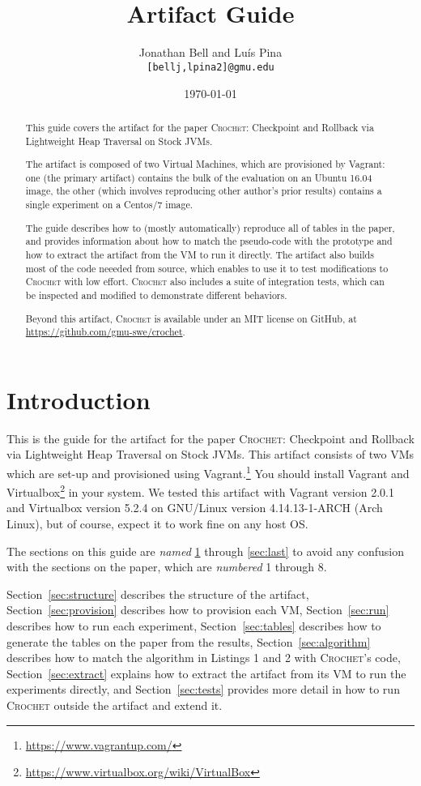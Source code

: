 \documentclass[12pt]{article}
\title{\emph{\papertitle} \\ Artifact Guide}
\author{Jonathan Bell and Lu\'{i}s Pina \\ \texttt{[bellj,lpina2]@gmu.edu}}
\affil{George Mason University}
\date{\today}
\newcommand{\sysname}{\textsc{Crochet}\xspace}
\newcommand{\papertitle}{\sysname: Checkpoint and Rollback via Lightweight Heap Traversal on Stock JVMs\xspace}
\begin{document}
\maketitle

\begin{abstract}

    This guide covers the artifact for the paper \papertitle.

    The artifact is composed of two Virtual Machines, which are provisioned by
    Vagrant: one (the primary artifact) contains the bulk of the evaluation on an Ubuntu 16.04 image,
    the other (which involves reproducing other author's prior results) contains a single experiment on a Centos/7 image.

    The guide describes how to (mostly automatically) reproduce all of tables in the paper,
    and provides information about how to match the pseudo-code with the
    prototype and how to extract the artifact from the VM to run it directly.
    The artifact also builds most of the code neeeded from source, which enables
    to use it to test modifications to \sysname with low effort. \sysname also includes a suite of integration tests, which can be inspected and modified to demonstrate different behaviors.

Beyond this artifact, \sysname is available under an MIT license on GitHub, at \url{https://github.com/gmu-swe/crochet}.
\end{abstract}

\section{Introduction}
\label{sec:first}

This is the guide for the artifact for the paper \papertitle.  This artifact consists
of two VMs which are set-up and provisioned using
Vagrant.\footnote{\url{https://www.vagrantup.com/}}  You should install Vagrant
and Virtualbox\footnote{\url{https://www.virtualbox.org/wiki/VirtualBox}} in
your system.  We tested this artifact with Vagrant version 2.0.1 and Virtualbox
version 5.2.4 on GNU/Linux version 4.14.13-1-ARCH (Arch Linux), but of course, expect it to work fine on any host OS.

The sections on this guide are \emph{named} \ref{sec:first} through
\ref{sec:last} to avoid any confusion with the sections on the paper, which are
\emph{numbered} 1 through 8.

Section~\ref{sec:structure} describes the structure of the artifact,
Section~\ref{sec:provision} describes how to provision each VM,
Section~\ref{sec:run} describes how to run each experiment,
Section~\ref{sec:tables} describes how to generate the tables on the paper from
the results, Section~\ref{sec:algorithm} describes how to match the algorithm in
Listings 1 and 2 with \sysname's code, Section~\ref{sec:extract} explains how to
extract the artifact from its VM to run the experiments directly, and
Section~\ref{sec:tests} provides more detail in how to run \sysname outside the
artifact and extend it.
\end{document}
